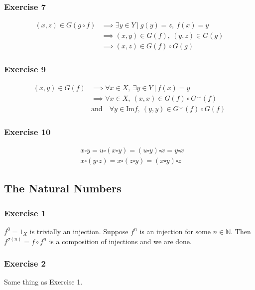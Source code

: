 \subsubsection{Exercise 7}
\begin{align*}
        (x, z) \in G(g \circ f) &\implies \exists y \in Y \: | \: g(y) = z, \: f(x) = y \\
                                &\implies (x, y) \in G(f), \: (y, z) \in G(g) \\
                                &\implies (x, z) \in G(f) \circ G(g)
\end{align*}

\subsubsection{Exercise 9} 
\begin{align*}
        (x, y) \in G(f) &\implies \forall x \in X, \: \exists y \in Y \: | \: f(x) = y \\
                        &\implies \forall x \in X, \: (x, x) \in G(f) \circ G^{\smile} (f) \\
                        &\text{and} \quad \forall y \in \text{Im} f, \: (y, y) \in G^{\smile} (f) \circ G(f)
\end{align*}

\subsubsection{Exercise 10}
\begin{align*}
        &x \square y = u \square (x \square y) = (u \square y) \square x = y \square x \\
        &x \square (y \square z) = x \square (z \square y) = (x \square y) \square z
\end{align*}

\subsection{The Natural Numbers}

\subsubsection{Exercise 1}
$f^0 = 1_X$ is trivially an injection. Suppose $f^n$ is an injection for some $n \in \mathbb{N}$.
Then $f^{\sigma(n)} = f \circ f^n$ is a composition of injections and we are done.

\subsubsection{Exercise 2}
Same thing as Exercise 1.

